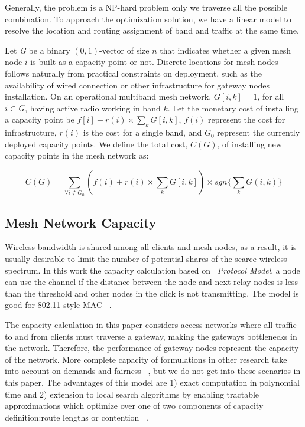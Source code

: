 Generally, the problem is a NP-hard problem only we traverse all the possible combination. To approach the optimization solution, we have a linear model to resolve the location and routing assignment of band and traffic at the same time.

 
Let \emph{G} be a binary $(0,1)$-vector of size $n$ that indicates whether a given mesh node $i$ is built as a capacity point or not. 
Discrete locations for mesh nodes follows naturally from practical constraints on deployment, such as the availability of wired connection or other infrastructure for gateway nodes installation.
On an operational multiband mesh network, $G[i,k]=1$, for all $i\in \emph{G}$, having active radio working in band $k$. Let the monetary cost of installing a capacity point be $f[i]+r(i)\times \sum_kG[i,k]$, $f(i)$ represent the cost for infrastructure, $r(i)$ is the cost for a single band, and \emph{$G_0$} represent the currently deployed capacity points.
We define the total cost, $C(G)$, of installing new capacity points in the mesh network as:

\begin{equation}
\label{eq:cost}
C(G)=\sum_{\forall i\notin G_0} (f(i)+r(i)\times \sum_kG[i,k]) \times sgn\{\sum_kG(i,k)\}
\end{equation}





\subsection{Mesh Network Capacity}
\label{subsec:capacity}
Wireless bandwidth is shared among all clients and mesh nodes, as a result, it is usually desirable to limit the number of potential shares of the scarce wireless spectrum. 
In this work the capacity calculation based on ~\emph{Protocol Model}, a node can use the channel if the distance between the node and next relay nodes is less than the threshold and other nodes in the click is not transmitting. The model is good for 802.11-style MAC ~\cite{jain2005impact}.

The capacity calculation in this paper considers access networks where all traffic to and from clients must traverse a gateway, making the gateways bottlenecks in the network. 
Therefore, the performance of gateway nodes represent the capacity of the network. 
More complete capacity of formulations in other research take into account on-demands and fairness ~\cite{arkoulis2013optimal}, but we do not get into these scenarios in this paper.
The advantages of this model are 1) exact computation in polynomial time and 2) extension to local search algorithms by enabling tractable approximations which optimize over one of two components of capacity definition:route lengths or contention ~\cite{robinson2008adding}.

